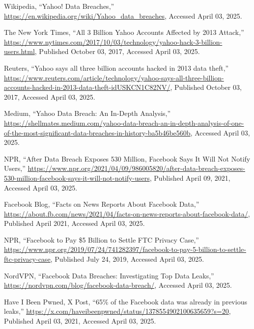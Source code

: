 \documentclass[11pt]{book}
\begin{document}
\clearpage
\begin{thebibliography}{99}

Wikipedia, ``Yahoo! Data Breaches,''
\url{https://en.wikipedia.org/wiki/Yahoo_data_breaches},
Accessed April 03, 2025.

The New York Times, ``All 3 Billion Yahoo Accounts Affected by 2013 Attack,''
\url{https://www.nytimes.com/2017/10/03/technology/yahoo-hack-3-billion-users.html},
Published October 03, 2017, Accessed April 03, 2025.

Reuters, ``Yahoo says all three billion accounts hacked in 2013 data theft,''
\url{https://www.reuters.com/article/technology/yahoo-says-all-three-billion-accounts-hacked-in-2013-data-theft-idUSKCN1C82NV/},
Published October 03, 2017, Accessed April 03, 2025.

Medium, ``Yahoo Data Breach: An In-Depth Analysis,'' \\
\url{https://shellmates.medium.com/yahoo-data-breach-an-in-depth-analysis-of-one-of-the-most-significant-data-breaches-in-history-ba5b46be560b},
Accessed April 03, 2025.

NPR, ``After Data Breach Exposes 530 Million, Facebook Says It Will Not Notify Users,''
\url{https://www.npr.org/2021/04/09/986005820/after-data-breach-exposes-530-million-facebook-says-it-will-not-notify-users},
Published April 09, 2021, Accessed April 03, 2025.

Facebook Blog, ``Facts on News Reports About Facebook Data,''
\url{https://about.fb.com/news/2021/04/facts-on-news-reports-about-facebook-data/},
Published April 2021, Accessed April 03, 2025.

NPR, ``Facebook to Pay \$5 Billion to Settle FTC Privacy Case,''
\url{https://www.npr.org/2019/07/24/741282397/facebook-to-pay-5-billion-to-settle-ftc-privacy-case},
Published July 24, 2019, Accessed April 03, 2025.

NordVPN, ``Facebook Data Breaches: Investigating Top Data Leaks,''
\url{https://nordvpn.com/blog/facebook-data-breach/},
Accessed April 03, 2025.

Have I Been Pwned, X Post, ``65\% of the Facebook data was already in previous leaks,''
\url{https://x.com/haveibeenpwned/status/1378554902100635659?s=20},
Published April 03, 2021, Accessed April 03, 2025.



\end{thebibliography}
\end{document}
